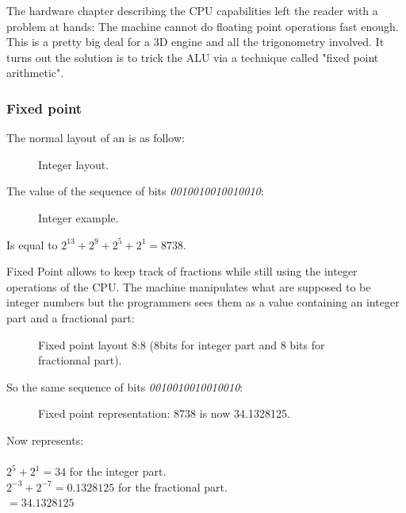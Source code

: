The hardware chapter describing the CPU capabilities left the reader with a problem at hands: The machine cannot do floating point operations fast enough. This is a pretty big deal for a 3D engine and all the trigonometry involved. It turns out the solution is to trick the ALU via a technique called "fixed point arithmetic".







\subsubsection{Fixed point}
The normal layout of an  is as follow:
\begin{figure}[H]
\centering
 
 \caption{Integer layout.} \label{fig:int_layout}
 \end{figure}
The value of the sequence of bits \emph{0010010010010010}:
\begin{figure}[H]
\centering

 \caption{Integer example.} \label{fig:mips}
 \end{figure}

 Is equal to $ 2^{13} + 2^9 + 2^5 + 2^1 =  8738 $.\\
 \par

Fixed Point allows to keep track of fractions while still using the integer operations of the CPU. The machine manipulates what are supposed to be integer numbers but the programmers sees them as a value containing an integer part and a fractional part:\\
\par
\begin{figure}[H]
 \centering
  
 \caption{Fixed point layout 8:8 (8bits for integer part and 8 bits for fractionnal part).} \label{fig:mips}
\end{figure}

So the same sequence of bits \emph{0010010010010010}:
\begin{figure}[H]
 \centering
   
  \caption{Fixed point representation: 8738 is now 34.1328125.} \label{fig:mips}
\end{figure} 

Now represents:\\
\\
$ 2^5 + 2^1 = 34 $ for the integer part.\\
$ 2^{-3}+2^{-7} = 0.1328125 $ for the fractional part.\\
$ = 34.1328125$\\

